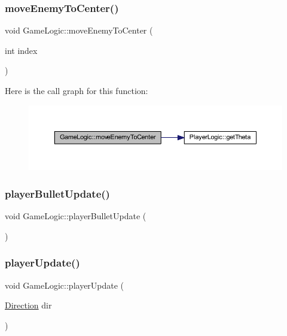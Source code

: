 \subsubsection{\texorpdfstring{move\+Enemy\+To\+Center()}{moveEnemyToCenter()}}
{\footnotesize\ttfamily void Game\+Logic\+::move\+Enemy\+To\+Center (\begin{DoxyParamCaption}\item[{int}]{index }\end{DoxyParamCaption})}

Here is the call graph for this function\+:
\nopagebreak
\begin{figure}[H]
\begin{center}
\leavevmode
\includegraphics[width=350pt]{class_game_logic_af355faaa66630a76a14ef0d7dc5adb54_cgraph}
\end{center}
\end{figure}
\mbox{\label{class_game_logic_a2293e862afa9caa43ac1c21757b9c914}} 
\subsubsection{\texorpdfstring{player\+Bullet\+Update()}{playerBulletUpdate()}}
{\footnotesize\ttfamily void Game\+Logic\+::player\+Bullet\+Update (\begin{DoxyParamCaption}{ }\end{DoxyParamCaption})}

\mbox{\label{class_game_logic_a3bb909e55fc7c811aa0e3e6a92b881bb}} 
\subsubsection{\texorpdfstring{player\+Update()}{playerUpdate()}}
{\footnotesize\ttfamily void Game\+Logic\+::player\+Update (\begin{DoxyParamCaption}\item[{\hyperlink{_game_common_data_8h_a224b9163917ac32fc95a60d8c1eec3aa}{Direction}}]{dir }\end{DoxyParamCaption})}

